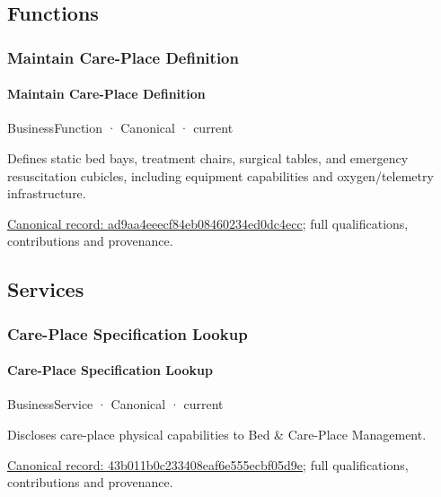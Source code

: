 \subsection{Functions}

\subsubsection{Maintain Care-Place Definition}

\paragraph{Maintain Care-Place Definition}

\label{element:ad9aa4eeecf84eb08460234ed0dc4ecc}
{\small BusinessFunction · Canonical · current}\par

Defines static bed bays, treatment chairs, surgical tables, and emergency resuscitation cubicles, including equipment capabilities and oxygen/telemetry infrastructure.


{\footnotesize \href{../../../../continuum/business/business-function/ad9aa4eeecf84eb08460234ed0dc4ecc.md}{Canonical record: ad9aa4eeecf84eb08460234ed0dc4ecc}; full qualifications, contributions and provenance.}\par
\subsection{Services}

\subsubsection{Care-Place Specification Lookup}

\paragraph{Care-Place Specification Lookup}

\label{element:43b011b0c233408eaf6e555ecbf05d9e}
{\small BusinessService · Canonical · current}\par

Discloses care-place physical capabilities to Bed \& Care-Place Management.


{\footnotesize \href{../../../../continuum/business/business-service/43b011b0c233408eaf6e555ecbf05d9e.md}{Canonical record: 43b011b0c233408eaf6e555ecbf05d9e}; full qualifications, contributions and provenance.}\par

